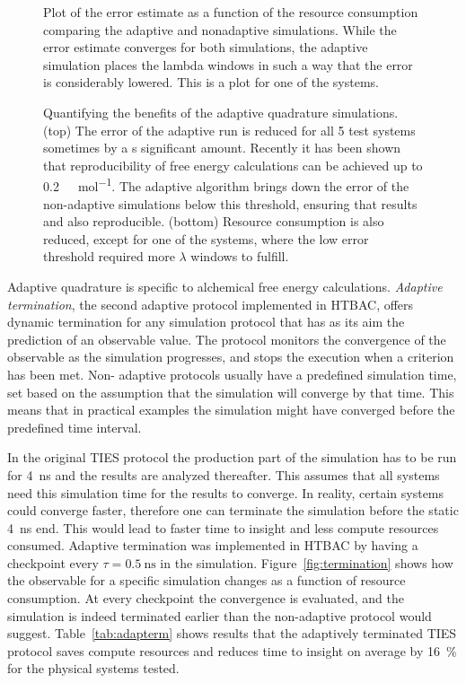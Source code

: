 \begin{figure}
  
  \caption{Plot of the error estimate as a function of the resource
  consumption comparing the adaptive and nonadaptive simulations. While the
  error estimate converges for both simulations, the adaptive simulation
  places the lambda windows in such a way that the error is considerably
  lowered. This is a plot for one of the systems.}
\label{fig:adapconv}
\end{figure}

\begin{figure}
  \caption{Quantifying the benefits of the adaptive quadrature simulations.
  (top) The error of the adaptive run is reduced for all 5 test systems
  sometimes by a s significant amount. Recently \cite{Loeffler2018} it has been
  shown that reproducibility of free energy calculations can be achieved up to
  \SI{0.2}{\kilo\calorie\per\mole}. The adaptive algorithm brings down the error
  of the non-adaptive simulations below this threshold, ensuring that results
  and also reproducible. (bottom) Resource consumption is also reduced, except
  for one of the systems, where the low error threshold required more $\lambda$
  windows to fulfill.}
  \label{fig:savings}
\end{figure}

Adaptive quadrature is specific to alchemical free energy calculations.
\emph{Adaptive termination}, the second adaptive  protocol implemented in HTBAC, offers dynamic termination for any
simulation protocol that has as its aim the prediction of an observable value.
The protocol monitors the convergence of the observable as the simulation
progresses, and stops the execution when a criterion has been met. Non-
adaptive protocols usually have a predefined simulation time, set based on the
assumption that the simulation will converge by that time. This means that in
practical examples the simulation might have converged before the predefined
time interval.

In the original TIES protocol the production part of the simulation has to be
run for \SI{4}{\nano\second} and the results are analyzed thereafter. This
assumes that all systems need this simulation time for the results to converge.
In reality, certain systems could converge faster, therefore one can terminate
the simulation before the static \SI{4}{\nano\second} end. This would lead to
faster time to insight and less compute resources consumed. Adaptive termination
was implemented in HTBAC by having a checkpoint every $\tau =
\SI{0.5}{\nano\second}$ in the simulation. Figure~\ref{fig:termination} shows
how the observable for a specific simulation changes as a function of resource
consumption. At every checkpoint the convergence is evaluated, and the
simulation is indeed terminated earlier than the non-adaptive protocol would
suggest. Table~\ref{tab:adapterm} shows results that the adaptively terminated
TIES protocol saves compute resources and reduces time to insight on average by
\SI{16}{\percent} for the physical systems tested.

